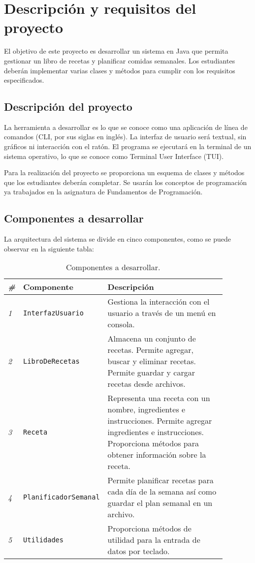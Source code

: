\documentclass[
    a4paper, %
    12pt, %
]{CSSullivanBusinessReport}
\begin{document}
\section{Descripción y requisitos del proyecto}
El objetivo de este proyecto es desarrollar un sistema en Java que permita gestionar un libro de recetas y planificar comidas semanales. Los estudiantes deberán implementar varias clases y métodos para cumplir con los requisitos especificados.

\subsection{Descripción del proyecto}
La herramienta a desarrollar es lo que se conoce como una aplicación de línea de comandos (CLI, por sus siglas en inglés). La interfaz de usuario será textual, sin gráficos ni interacción con el ratón. El programa se ejecutará en la terminal de un sistema operativo, lo que se conoce como Terminal User Interface (TUI).

Para la realización del proyecto se proporciona un esquema de clases y métodos que los estudiantes deberán completar. Se usarán los conceptos de programación ya trabajados en la asignatura de Fundamentos de Programación.

\subsection{Componentes a desarrollar}
La arquitectura del sistema se divide en cinco componentes, como se puede observar en la siguiente tabla:

\begin{table*} %
    \caption{Componentes a desarrollar.}
    \begin{tabular}{C{0.03\linewidth} L{0.3\linewidth} L{0.55\linewidth}}
        \toprule
        \textit{\#} & \textbf{Componente} & \textbf{Descripción} \\
        \midrule
        \textit{1} & \texttt{InterfazUsuario} & Gestiona la interacción con el usuario a través de un menú en consola.\\
        \textit{2} & \texttt{LibroDeRecetas} & Almacena un conjunto de recetas. Permite agregar, buscar y eliminar recetas. Permite guardar y cargar recetas desde archivos.\\
        \textit{3} & \texttt{Receta} & Representa una receta con un nombre, ingredientes e instrucciones. Permite agregar ingredientes e instrucciones. Proporciona métodos para obtener información sobre la receta.\\
        \textit{4} & \texttt{PlanificadorSemanal} & Permite planificar recetas para cada día de la semana así como guardar el plan semanal en un archivo.\\
        \textit{5} & \texttt{Utilidades} & Proporciona métodos de utilidad para la entrada de datos por teclado.\\
        \bottomrule
    \end{tabular}
\end{table*}
\end{document}
